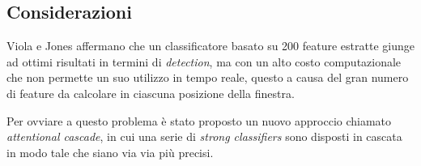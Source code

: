 \subsection{Considerazioni}

Viola e Jones affermano che un classificatore basato su 200 feature estratte giunge ad ottimi risultati in termini di \emph{detection}, ma con un alto costo computazionale che non permette un suo utilizzo in tempo reale, questo a causa del gran numero di feature da calcolare in ciascuna posizione della finestra.

Per ovviare a questo problema è stato proposto un nuovo approccio chiamato \emph{attentional cascade}, in cui una serie di \emph{strong classifiers} sono disposti in cascata in modo tale che siano via via più precisi.
